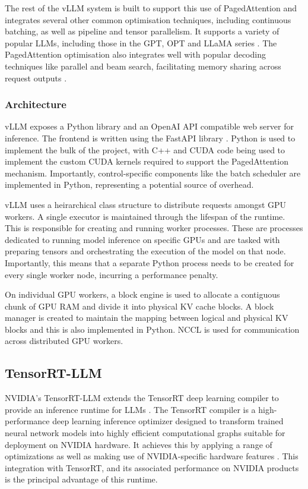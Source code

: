\documentclass[12pt,twoside]{report}
\begin{document}
The rest of the vLLM system is built to support this use of PagedAttention and integrates several other common optimisation techniques, including continuous batching, as well as pipeline and tensor parallelism.
It supports a variety of popular LLMs, including those in the GPT, OPT and LLaMA series \cite{radford2018improving} \cite{zhang2022opt} \cite{touvron2023llama}.
The PagedAttention optimisation also integrates well with popular decoding techniques like parallel and beam search, facilitating memory sharing across request outputs \cite{kwon2023efficient}.

\subsubsection{Architecture}
vLLM exposes a Python library and an OpenAI API \cite{openaiapi} compatible web server for inference.
The frontend is written using the FastAPI library \cite{fastapi}.
Python is used to implement the bulk of the project, with C++ and CUDA code being used to implement the custom CUDA kernels required to support the PagedAttention mechanism.
Importantly, control-specific components like the batch scheduler are implemented in Python, representing a potential source of overhead.

vLLM uses a heirarchical class structure to distribute requests amongst GPU workers.
A single executor is maintained through the lifespan of the runtime.
This is responsible for creating and running worker processes.
These are processes dedicated to running model inference on specific GPUs and are tasked with preparing tensors and orchestrating the execution of the model on that node. 
Importantly, this means that a separate Python process needs to be created for every single worker node, incurring a performance penalty.

On individual GPU workers, a block engine is used to allocate a contiguous chunk of GPU RAM and divide it into physical KV cache blocks.
A block manager is created to maintain the mapping between logical and physical KV blocks and this is also implemented in Python. 
NCCL \cite{nccl} is used for communication across distributed GPU workers.

\subsection{TensorRT-LLM}
NVIDIA's TensorRT-LLM extends the TensorRT deep learning compiler to provide an inference runtime for LLMs \cite{nvidiainferencewhitepaper}.
The TensorRT compiler is a high-performance deep learning inference optimizer designed to transform trained neural network models into highly efficient computational graphs suitable for deployment on NVIDIA hardware. 
It achieves this by applying a range of optimizations as well as making use of NVIDIA-specific hardware features \cite{nvidiainferencewhitepaper}. 
This integration with TensorRT, and its associated performance on NVIDIA products is the principal advantage of this runtime.
\end{document}
